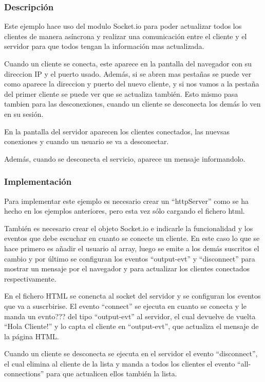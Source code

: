 \documentclass{article}
\begin{document}
\subsubsection{Descripción}
Este ejemplo hace uso del modulo Socket.io para poder actualizar todos los clientes de manera asíncrona y realizar una comunicación entre el cliente y el servidor para que todos tengan la información mas actualizada.

Cuando un cliente se conecta, este aparece en la pantalla del navegador con su direccion IP y el puerto usado. Además, si se abren mas pestañas se puede ver como aparece la direccion y puerto del nuevo cliente, y si nos vamos a la pestaña del primer cliente se puede ver que se actualiza también. Esto mismo pasa tambien para las desconexiones, cuando un cliente se desconecta los demás lo ven en su sesión.

En la pantalla del servidor aparecen los clientes conectados, las nuevsas conexiones y cuando un usuario se va a desconectar.


Además, cuando se desconecta el servicio, aparece un mensaje informandolo.

\subsubsection{Implementación}
Para implementar este ejemplo es necesario crear un ``httpServer'' como se ha hecho en los ejemplos anteriores, pero esta vez sólo cargando el fichero html.

También es necesario crear el objeto Socket.io e indicarle la funcionalidad y los eventos que debe escuchar en cuanto se conecte un cliente. En este caso lo que se hace primero es añadir el usuario al array, luego se emite a los demás suscritos el cambio y por último se configuran los eventos ``output-evt'' y ``disconnect'' para mostrar un mensaje por el navegador y para actualizar los clientes conectados respectivamente.

En el fichero HTML se conencta al socket del servidor y se configuran los eventos que va a suscrbirise. El evento ``connect'' se ejecuta en cuanto se conecta y le manda un evnto??? del tipo ``output-evt'' al servidor, el cual devuelve de vuelta ``Hola Cliente!'' y lo capta el cliente en ``output-evt'', que actualiza el mensaje de la página HTML.

Cuando un cliente se desconecta se ejecuta en el servidor el evento ``disconnect'', el cual elimina al cliente de la lista y manda a todos los clientes el evento ``all-connections'' para que actualicen ellos también la lista.
\end{document}
